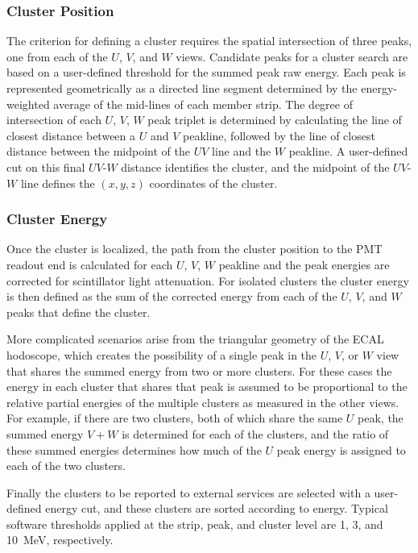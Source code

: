 \subsubsection {Cluster Position}

The criterion for defining a cluster requires the spatial intersection of three peaks, one from each of the $U$,
$V$, and $W$ views. Candidate peaks for a cluster search are based on a user-defined threshold for the
summed peak raw energy. Each peak is represented geometrically as a directed line segment determined by the
energy-weighted average of the mid-lines of each member strip. The degree of intersection of each $U$, $V$,
$W$ peak triplet is determined by calculating the line of closest distance between a $U$ and $V$ peakline,
followed by the line of closest distance between the midpoint of the $UV$ line and the $W$ peakline. A
user-defined cut on this final $UV$-$W$ distance identifies the cluster, and the midpoint of the $UV$-$W$
line defines the $(x,y,z)$ coordinates of the cluster.

\subsubsection {Cluster Energy}

Once the cluster is localized, the path from the cluster position to the PMT readout end is calculated for each $U$,
$V$, $W$ peakline and the peak energies are corrected for scintillator light attenuation.  For isolated clusters
the cluster energy is then defined as the sum of the corrected energy from each of the $U$, $V$, and $W$ peaks
that define the cluster.

More complicated scenarios arise from the triangular geometry of the ECAL hodoscope, which creates the
possibility of a single peak in the $U$, $V$, or $W$ view that shares the summed energy from two or more
clusters.  For these cases the energy in each cluster that shares that peak is assumed to be proportional to the
relative partial energies of the multiple clusters as measured in the other views.  For example, if there are two
clusters, both of which share the same $U$ peak, the summed energy $V+W$ is determined for each of the
clusters, and the ratio of these summed energies determines how much of the $U$ peak energy is assigned to
each of the two clusters.

Finally the clusters to be reported to external services are selected with a user-defined energy cut, and these
clusters are sorted according to energy. Typical software thresholds applied at the strip, peak, and cluster level
are 1, 3, and 10~MeV, respectively.

